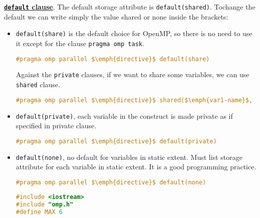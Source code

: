 \noindent
\textbf{\underline{\texttt{default} clause}}. The default storage attribute is \texttt{default(shared)}. To\break change the default we can write simply the value shared or none inside the brackets:
\begin{itemize}
    \item \texttt{default(share)} is the default choice for OpenMP, so there is no need to use it except for the clause \texttt{pragma omp task}.
    \begin{openmpbox}
        \begin{lstlisting}[language=C++]
#pragma omp parallel $\emph{directive}$ default(share)\end{lstlisting}
    \end{openmpbox}
    Against the \texttt{private} clauses, if we want to share some variables, we can use \texttt{shared} clause.
    \begin{openmpbox}
        \begin{lstlisting}[language=C++]
#pragma omp parallel $\emph{directive}$ shared($\emph{var1-name}$, ...)\end{lstlisting}
    \end{openmpbox}

    \item \texttt{default(private)}, each variable in the construct is made private as if specified in private clause.
    \begin{openmpbox}
        \begin{lstlisting}[language=C++]
#pragma omp parallel $\emph{directive}$ default(private)\end{lstlisting}
    \end{openmpbox}

    \item \texttt{default(none)}, no default for variables in static extent. Must list storage attribute for each variable in static extent. It is a good programming practice.
    \begin{openmpbox}
        \begin{lstlisting}[language=C++]
#pragma omp parallel $\emph{directive}$ default(none)\end{lstlisting}
    \end{openmpbox}
    \newpage
    \begin{examplebox}
\begin{lstlisting}[language=C++]
#include <iostream>
#include "omp.h"
#define MAX 6


\end{lstlisting}
\end{examplebox}
\end{itemize}
